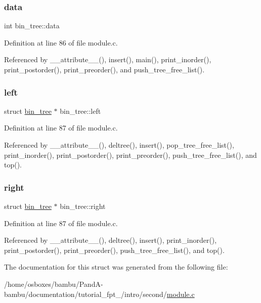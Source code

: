 \subsubsection{\texorpdfstring{data}{data}}
{\footnotesize\ttfamily int bin\+\_\+tree\+::data}



Definition at line 86 of file module.\+c.



Referenced by \+\_\+\+\_\+attribute\+\_\+\+\_\+(), insert(), main(), print\+\_\+inorder(), print\+\_\+postorder(), print\+\_\+preorder(), and push\+\_\+tree\+\_\+free\+\_\+list().

\mbox{\label{structbin__tree_a7b0d1e87f884d550c649078178195734}} 
\subsubsection{\texorpdfstring{left}{left}}
{\footnotesize\ttfamily struct \hyperlink{structbin__tree}{bin\+\_\+tree} $\ast$ bin\+\_\+tree\+::left}



Definition at line 87 of file module.\+c.



Referenced by \+\_\+\+\_\+attribute\+\_\+\+\_\+(), deltree(), insert(), pop\+\_\+tree\+\_\+free\+\_\+list(), print\+\_\+inorder(), print\+\_\+postorder(), print\+\_\+preorder(), push\+\_\+tree\+\_\+free\+\_\+list(), and top().

\mbox{\label{structbin__tree_a5cf772dd37b0389f1fc3716e6ce083a3}} 
\subsubsection{\texorpdfstring{right}{right}}
{\footnotesize\ttfamily struct \hyperlink{structbin__tree}{bin\+\_\+tree} $\ast$ bin\+\_\+tree\+::right}



Definition at line 87 of file module.\+c.



Referenced by \+\_\+\+\_\+attribute\+\_\+\+\_\+(), deltree(), insert(), print\+\_\+inorder(), print\+\_\+postorder(), print\+\_\+preorder(), push\+\_\+tree\+\_\+free\+\_\+list(), and top().



The documentation for this struct was generated from the following file\+:\begin{DoxyCompactItemize}
\item 
/home/osboxes/bambu/\+Pand\+A-\/bambu/documentation/tutorial\+\_\+fpt\+\_/intro/second/\hyperlink{tutorial__fpt__2017_2intro_2second_2module_8c}{module.\+c}\end{DoxyCompactItemize}
